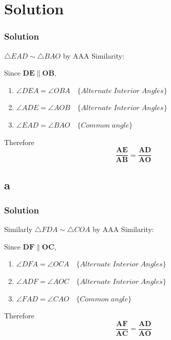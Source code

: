 \documentclass{beamer}
\renewcommand{\vec}[1]{\mathbf{#1}}
\begin{document}
\section*{\textbf{Solution}}
\begin{frame}[fragile]
\footnotesize
\frametitle{Solution}
 $\triangle EAD \sim \triangle BAO$ by AAA Similarity:

Since $\vec{DE} \parallel \vec{OB}$,
\begin{enumerate}
	\item $\angle{DEA} = \angle{OBA} \quad \{Alternate\; Interior\; Angles\}$
	\item $\angle{ADE} = \angle{AOB} \quad \{Alternate\; Interior\; Angles\}$
	  
	\item $\angle{EAD} = \angle{BAO} \quad \{Common\; angle\} $
	
\end{enumerate}

Therefore 
\begin{equation}
\vec{\frac{AE}{AB}} = \vec{\frac{AD}{AO}}
\end{equation}
\end{frame}
\subsection{a}


\begin{frame}
\frametitle{Solution}
\footnotesize
\label{a}
Similarly 
$\triangle FDA \sim \triangle COA$ by AAA Similarity:

Since $\vec{DF} \parallel \vec{OC}$,
\begin{enumerate}
	\item $\angle{DFA} = \angle{OCA} \quad \{Alternate\; Interior\; Angles\}$
	\item $\angle{ADF} = \angle{AOC} \quad \{Alternate\; Interior\; Angles\}$
	  
	\item $\angle{FAD} = \angle{CAO} \quad \{Common\; angle\} $
	
\end{enumerate}

Therefore 
\begin{equation}
\vec{\frac{AF}{AC}} = \vec{\frac{AD}{AO}}
\end{equation}
\end{frame}
\end{document}
